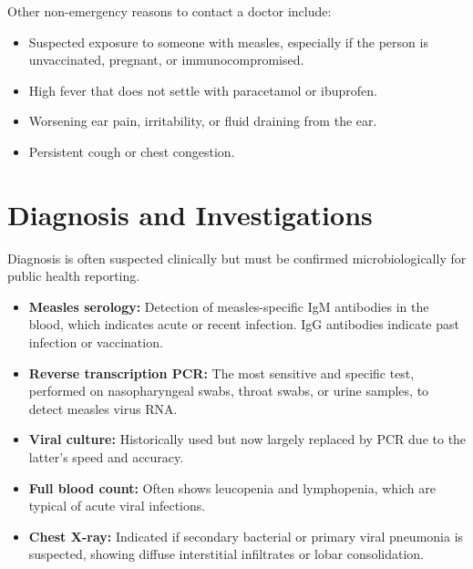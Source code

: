 Other non-emergency reasons to contact a doctor include:
\begin{itemize}
    \item Suspected exposure to someone with measles, especially if the person is unvaccinated, pregnant, or immunocompromised.
    \item High fever that does not settle with paracetamol or ibuprofen.
    \item Worsening ear pain, irritability, or fluid draining from the ear.
    \item Persistent cough or chest congestion.
\end{itemize}

\section*{Diagnosis and Investigations}
Diagnosis is often suspected clinically but must be confirmed microbiologically for public health reporting.
\begin{itemize}
    \item \textbf{Measles serology:} Detection of measles-specific IgM antibodies in the blood, which indicates acute or recent infection. IgG antibodies indicate past infection or vaccination.
    \item \textbf{Reverse transcription PCR:} The most sensitive and specific test, performed on nasopharyngeal swabs, throat swabs, or urine samples, to detect measles virus RNA.
    \item \textbf{Viral culture:} Historically used but now largely replaced by PCR due to the latter's speed and accuracy.
    \item \textbf{Full blood count:} Often shows leucopenia and lymphopenia, which are typical of acute viral infections.
    \item \textbf{Chest X-ray:} Indicated if secondary bacterial or primary viral pneumonia is suspected, showing diffuse interstitial infiltrates or lobar consolidation.
\end{itemize}

